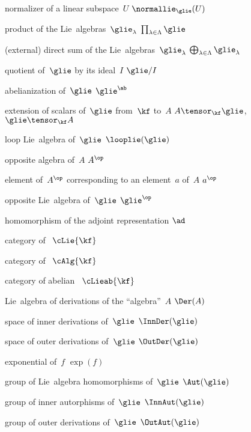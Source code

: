 {normalizer of a linear subspace~$U$}
{$\normallie_{\glie}(U)$}

{product of the Lie~algebras~$\glie_\lambda$}
{$\prod_{\lambda \in \Lambda} \glie$}

{(external) direct sum of the Lie~algebras~$\glie_\lambda$}
{$\bigoplus_{\lambda \in \Lambda} \glie_\lambda$}

{quotient of~$\glie$ by its ideal~$I$}
{$\glie/I$}

{abelianization of~$\glie$}
{$\glie^{\ab}$}

{extension of scalars of~$\glie$ from~$\kf$ to~$A$}
{$A \tensor_{\kf} \glie$,~$\glie \tensor_{\kf} A$}

{loop Lie~algebra of~$\glie$}
{$\looplie(\glie)$}

{opposite algebra of~$A$}
{$A^{\op}$}

{element of~$A^\op$ corresponding to an element~$a$ of~$A$}
{$a^{\op}$}

{opposite Lie~algebra of~$\glie$}
{$\glie^{\op}$}

{homomorphism of the adjoint representation}
{$\ad$}

{category of~\liealgebras{$\kf$}}
{$\cLie{\kf}$}

{category of~\algebras{$\kf$}}
{$\cAlg{\kf}$}

{category of abelian~\liealgebras{$\kf$}}
{$\cLieab{\kf}$}

{Lie~algebra of derivations of the \enquote{algebra}~$A$}
{$\Der(A)$}

{space of inner derivations of~$\glie$}
{$\InnDer(\glie)$}

{space of outer derivations of~$\glie$}
{$\OutDer(\glie)$}

{exponential of~$f$}
{$\exp(f)$}

{group of Lie~algebra homomorphisms of~$\glie$}
{$\Aut(\glie)$}

{group of inner autorphisms of~$\glie$}
{$\InnAut(\glie)$}

{group of outer derivations of~$\glie$}
{$\OutAut(\glie)$}

